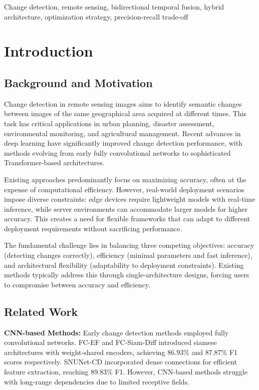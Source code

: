\documentclass[journal]{IEEEtran}
\begin{document}
\begin{IEEEkeywords}
Change detection, remote sensing, bidirectional temporal fusion, hybrid architecture, optimization strategy, precision-recall trade-off
\end{IEEEkeywords}

\section{Introduction}

\subsection{Background and Motivation}

Change detection in remote sensing images aims to identify semantic changes between images of the same geographical area acquired at different times. This task has critical applications in urban planning, disaster assessment, environmental monitoring, and agricultural management. Recent advances in deep learning have significantly improved change detection performance, with methods evolving from early fully convolutional networks to sophisticated Transformer-based architectures.

Existing approaches predominantly focus on maximizing accuracy, often at the expense of computational efficiency. However, real-world deployment scenarios impose diverse constraints: edge devices require lightweight models with real-time inference, while server environments can accommodate larger models for higher accuracy. This creates a need for flexible frameworks that can adapt to different deployment requirements without sacrificing performance.

The fundamental challenge lies in balancing three competing objectives: accuracy (detecting changes correctly), efficiency (minimal parameters and fast inference), and architectural flexibility (adaptability to deployment constraints). Existing methods typically address this through single-architecture designs, forcing users to compromise between accuracy and efficiency.

\subsection{Related Work}

\textbf{CNN-based Methods:} Early change detection methods employed fully convolutional networks. FC-EF \cite{fcsiam} and FC-Siam-Diff \cite{fcsiam} introduced siamese architectures with weight-shared encoders, achieving 86.93\% and 87.87\% F1 scores respectively. SNUNet-CD \cite{snunet} incorporated dense connections for efficient feature extraction, reaching 89.83\% F1. However, CNN-based methods struggle with long-range dependencies due to limited receptive fields.
\end{document}
